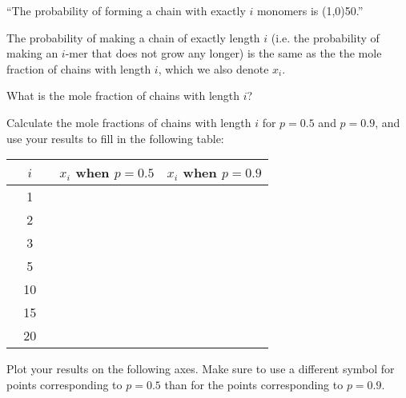 \begin{activity}
\begin{ctqs}
		``The probability of forming a chain with exactly $i$ monomers is \line(1,0){50}.''
	
		\begin{solution}[0.5in]
		\end{solution}
		
\end{ctqs}

\begin{infobox}

	The probability of making a chain of exactly length $i$ (i.e. the probability of making an $i$-mer that does not grow any longer) is the same as the %
	the mole fraction of chains with length $i$, which we also denote $x_i$.

\end{infobox}

\begin{ctqs}
	\question \label{stepdispersity:ctq:xi} What is the mole fraction of chains with length $i$?
	
		\begin{solution}[0.5in]
		\end{solution}
	
	\question Calculate the mole fractions of chains with length $i$ for $p=0.5$ and $p=0.9$, and use your results to fill in the following table:
	
		\begin{center}
			\renewcommand{\arraystretch}{4}
			\begin{tabular}{|c|c|c|}
				\hline
				\textbf{~~$i$~~} & $x_i$ when $p=0.5$ & $x_i$ when $p=0.9$ \\\hline
				1 & & \\\hline
				2 & & \\\hline
				3 & & \\\hline
				5 & & \\\hline
				10 & & \\\hline
				15 & & \\\hline
				20 & & \\\hline
			\end{tabular}
		\end{center}
		
		\clearpage
	\question Plot your results on the following axes.  Make sure to use a different symbol for points corresponding to $p=0.5$ than for the points corresponding to $p=0.9$.
	

\end{ctqs}
\end{activity}
